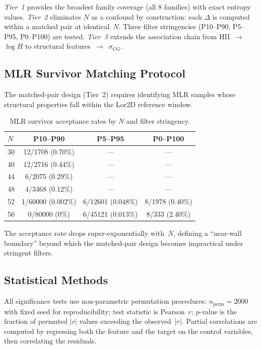 \documentclass[entropy,article,submit,pdftex,moreauthors]{Definitions/mdpi}
\begin{document}
\emph{Tier~1} provides the broadest family coverage (all 8 families) with exact entropy values. \emph{Tier~2} eliminates $N$ as a confound by construction: each $\Delta$ is computed within a matched pair at identical~$N$. Three filter stringencies (P10--P90, P5--P95, P0--P100) are tested. \emph{Tier~3} extends the association chain from HII~$\to$~$\log H$ to structural features~$\to$~$\sigma_\text{CG}$.

\subsection{MLR Survivor Matching Protocol}

The matched-pair design (Tier~2) requires identifying MLR samples whose structural properties fall within the Lor2D reference window.

\begin{table}[H]
\caption{MLR survivor acceptance rates by $N$ and filter stringency.\label{tab:survivors}}
\begin{tabular}{lccc}
\toprule
\boldmath$N$ & \textbf{P10--P90} & \textbf{P5--P95} & \textbf{P0--P100} \\
\midrule
30 & 12/1708 (0.70\%) & --- & --- \\
40 & 12/2716 (0.44\%) & --- & --- \\
44 & 6/2075 (0.29\%) & --- & --- \\
48 & 4/3468 (0.12\%) & --- & --- \\
52 & 1/60000 (0.002\%) & 6/12601 (0.048\%) & 8/1978 (0.40\%) \\
56 & 0/80000 (0\%) & 6/45121 (0.013\%) & 8/333 (2.40\%) \\
\bottomrule
\end{tabular}
\end{table}

The acceptance rate drops super-exponentially with~$N$, defining a ``near-wall boundary'' beyond which the matched-pair design becomes impractical under stringent filters.

\subsection{Statistical Methods}

All significance tests use non-parametric permutation procedures: $n_\text{perm} = 2000$ with fixed seed for reproducibility; test statistic is Pearson~$r$; $p$-value is the fraction of permuted $|r|$ values exceeding the observed~$|r|$. Partial correlations are computed by regressing both the feature and the target on the control variables, then correlating the residuals.
\end{document}
